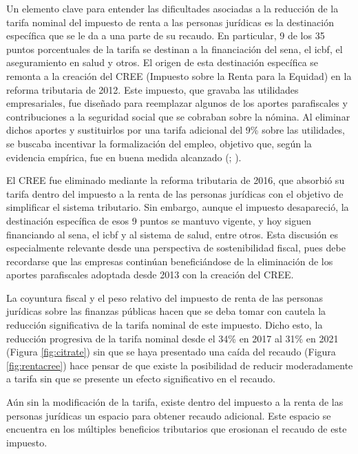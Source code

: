 Un elemento clave para entender las dificultades asociadas a la reducción de la tarifa nominal del impuesto de renta a las personas jurídicas es la destinación específica que se le da a una parte de su recaudo. En particular, 9 de los 35 puntos porcentuales de la tarifa se destinan a la financiación del \gls{sena}, el \gls{icbf}, el aseguramiento en salud y otros. El origen de esta destinación específica se remonta a la creación del CREE (Impuesto sobre la Renta para la Equidad) en la reforma tributaria de 2012. Este impuesto, que gravaba las utilidades empresariales, fue diseñado para reemplazar algunos de los aportes parafiscales y contribuciones a la seguridad social que se cobraban sobre la nómina. Al eliminar dichos aportes y sustituirlos por una tarifa adicional del 9\% sobre las utilidades, se buscaba incentivar la formalización del empleo, objetivo que, según la evidencia empírica, fue en buena medida alcanzado (\cite{bernal2017switching}; \cite{kugler2017payroll}). 

El CREE fue eliminado mediante la reforma tributaria de 2016, que absorbió su tarifa dentro del impuesto a la renta de las personas jurídicas con el objetivo de simplificar el sistema tributario. Sin embargo, aunque el impuesto desapareció, la destinación específica de esos 9 puntos se mantuvo vigente, y hoy siguen financiando al \gls{sena}, el \gls{icbf} y al sistema de salud, entre otros. Esta discusión es especialmente relevante desde una perspectiva de sostenibilidad fiscal, pues debe recordarse que las empresas continúan beneficiándose de la eliminación de los aportes parafiscales adoptada desde 2013 con la creación del CREE.



La coyuntura fiscal y el peso relativo del impuesto de renta de las personas jurídicas sobre las finanzas públicas hacen que se deba tomar con cautela la reducción significativa de la tarifa nominal de este impuesto. Dicho esto, la reducción progresiva de la tarifa nominal desde el 34\% en 2017 al 31\% en 2021 (Figura \ref{fig:citrate}) sin que se haya presentado una caída del recaudo (Figura \ref{fig:rentacree}) hace pensar de que existe la posibilidad de reducir moderadamente a tarifa sin que se presente un efecto significativo en el recaudo.

Aún sin la modificación de la tarifa, existe dentro del impuesto a la renta de las personas jurídicas un espacio para obtener recaudo adicional. Este espacio se encuentra en los múltiples beneficios tributarios que erosionan el recaudo de este impuesto. 

